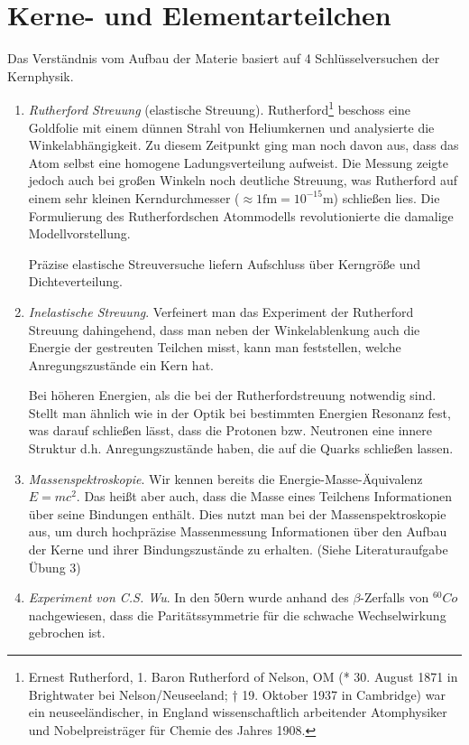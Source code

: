 \section{Kerne- und Elementarteilchen}

Das Verständnis vom Aufbau der Materie basiert auf 4 Schlüsselversuchen der
Kernphysik.
\begin{enumerate}[label=\arabic{*}.)]
\item\emph{Rutherford Streuung} (elastische Streuung).
Rutherford\footnote{Ernest Rutherford, 1. Baron Rutherford of Nelson, OM (* 30.
August 1871 in Brightwater bei Nelson/Neuseeland; † 19. Oktober 1937 in Cambridge)
war ein neuseeländischer, in England wissenschaftlich arbeitender Atomphysiker
und Nobelpreisträger für Chemie des Jahres 1908.} beschoss eine Goldfolie mit
einem dünnen Strahl von Heliumkernen und analysierte die Winkelabhängigkeit.
Zu diesem Zeitpunkt ging man noch davon aus, dass das Atom selbst eine
homogene Ladungsverteilung aufweist. Die Messung zeigte jedoch auch bei großen
Winkeln noch deutliche Streuung, was Rutherford auf einem sehr kleinen
Kerndurchmesser ($\approx 1\mathrm{fm} = 10^{-15}\mathrm{m}$) schließen lies.
Die Formulierung des Rutherfordschen Atommodells revolutionierte die damalige Modellvorstellung.

Präzise elastische Streuversuche liefern Aufschluss über Kerngröße und
Dichteverteilung.
\item \emph{Inelastische Streuung}. Verfeinert man das Experiment der Rutherford
Streuung dahingehend, dass man neben der Winkelablenkung auch die Energie der gestreuten Teilchen misst,
kann man feststellen, welche Anregungszustände ein Kern hat.

Bei höheren Energien, als die bei der Rutherfordstreuung notwendig sind. Stellt
man ähnlich wie in der Optik bei bestimmten Energien Resonanz fest, was darauf
schließen lässt, dass die Protonen bzw. Neutronen eine innere Struktur d.h.
Anregungszustände haben, die auf die Quarks schließen lassen.
\item \emph{Massenspektroskopie}. Wir kennen bereits die
Energie-Masse-Äquivalenz $E=mc^2$. Das heißt aber auch, dass die Masse eines
Teilchens Informationen über seine Bindungen enthält. Dies nutzt man bei der
Massenspektroskopie aus, um durch hochpräzise Massenmessung Informationen über
den Aufbau der Kerne und ihrer Bindungszustände zu erhalten. (Siehe
Literaturaufgabe Übung 3)
\item \emph{Experiment von C.S. Wu}. In den 50ern wurde anhand des
$\beta$-Zerfalls von ${}^{60}Co$ nachgewiesen, dass die Paritätssymmetrie für
die schwache Wechselwirkung gebrochen ist.
\end{enumerate}

